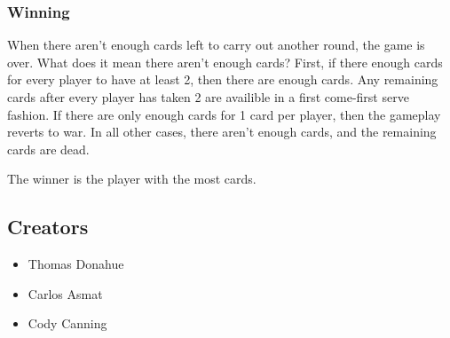 \documentclass[11pt]{article}
\begin{document}
\subsubsection{Winning}
\label{sec-1-2-3}

When there aren't enough cards left to carry out another round, the
game is over. What does it mean there aren't enough cards? First, if
there enough cards for every player to have at least 2, then there
are enough cards. Any remaining cards after every player has taken 2
are availible in a first come-first serve fashion. If there are only
enough cards for 1 card per player, then the gameplay reverts to war.
In all other cases, there aren't enough cards, and the remaining
cards are dead.

The winner is the player with the most cards.
\subsection{Creators}
\label{sec-1-3}

\begin{itemize}
\item Thomas Donahue
\item Carlos Asmat
\item Cody Canning
\end{itemize}
\end{document}
